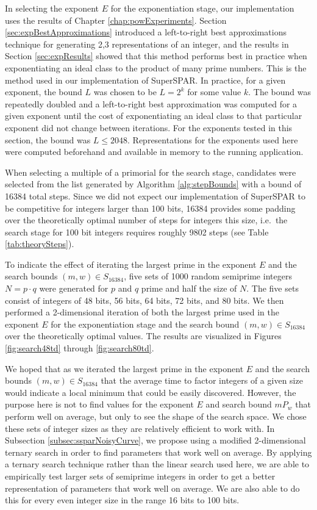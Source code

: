 \documentclass{ucalgthes1}
\theoremstyle{definition}
\begin{document}
In selecting the exponent $E$ for the exponentiation stage, our implementation uses the results of Chapter \ref{chap:powExperiments}.  Section \ref{sec:expBestApproximations} introduced a left-to-right best approximations technique for generating 2,3 representations of an integer, and the results in Section \ref{sec:expResults} showed that this method performs best in practice when exponentiating an ideal class to the product of many prime numbers.  This is the method used in our implementation of SuperSPAR.  In practice, for a given exponent, the bound $L$ was chosen to be $L=2^k$ for some value $k$.  The bound was repeatedly doubled and a left-to-right best approximation was computed for a given exponent until the cost of exponentiating an ideal class to that particular exponent did not change between iterations.  For the exponents tested in this section, the bound was $L \le 2048$.  Representations for the exponents used here were computed beforehand and available in memory to the running application.

When selecting a multiple of a primorial for the search stage, candidates were selected from the list generated by Algorithm \ref{alg:stepBounds} with a bound of 16384 total steps.  Since we did not expect our implementation of SuperSPAR to be competitive for integers larger than 100 bits, 16384 provides some padding over the theoretically optimal number of steps for integers this size, i.e.\ the search stage for 100 bit integers requires roughly 9802 steps (see Table \ref{tab:theorySteps}).

To indicate the effect of iterating the largest prime in the exponent $E$ and the search bounds $(m, w) \in S_{16384}$, five sets of 1000 random semiprime integers $N = p \cdot q$ were generated for $p$ and $q$ prime and half the size of $N$.  The five sets consist of integers of 48 bits, 56 bits, 64 bits, 72 bits, and 80 bits.  We then performed a 2-dimensional iteration of both the largest prime used in the exponent $E$ for the exponentiation stage and the search bound $(m, w) \in S_{16384}$ over the theoretically optimal values.  The results are visualized in Figures \ref{fig:search48td} through \ref{fig:search80td}.

We hoped that as we iterated the largest prime in the exponent $E$ and the search bounds $(m, w) \in S_{16384}$ that the average time to factor integers of a given size would indicate a local minimum that could be easily discovered.  However, the purpose here is not to find values for the exponent $E$ and search bound $mP_w$ that perform well on average, but only to see the shape of the search space.  We chose these sets of integer sizes as they are relatively efficient to work with.  In Subsection \ref{subsec:ssparNoisyCurve}, we propose using a modified 2-dimensional ternary search in order to find parameters that work well on average.  By applying a ternary search technique rather than the linear search used here, we are able to empirically test larger sets of semiprime integers in order to get a better representation of parameters that work well on average.  We are also able to do this for every even integer size in the range 16 bits to 100 bits.
\end{document}
